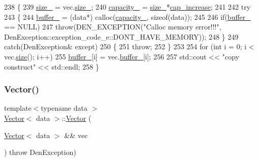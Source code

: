 \begin{DoxyCode}
238     \{
239         \hyperlink{classVector_a3c70fa478530a90177f2a7e7621ee688}{size\_} = vec.\hyperlink{classVector_a3c70fa478530a90177f2a7e7621ee688}{size\_};
240         \hyperlink{classVector_ad75911bb39018821f0e2911b6905b7ec}{capacity\_} = \hyperlink{classVector_a3c70fa478530a90177f2a7e7621ee688}{size\_}*\hyperlink{classVector_ae612684de42f3ecdefd867b54d232647}{cap\_increase};
241 
242         \textcolor{keywordflow}{try}
243             \{
244                 \hyperlink{classVector_a22db58ae9e92c6014e8ac657804a035a}{buffer\_} = (data*) calloc(\hyperlink{classVector_ad75911bb39018821f0e2911b6905b7ec}{capacity\_}, \textcolor{keyword}{sizeof}(data));
245 
246                 \textcolor{keywordflow}{if}(\hyperlink{classVector_a22db58ae9e92c6014e8ac657804a035a}{buffer\_} == NULL)
247                     \textcolor{keywordflow}{throw}(DEN\_EXCEPTION(\textcolor{stringliteral}{"Calloc memory error!!!"}, 
      DenException::exception\_code\_e::DONT\_HAVE\_MEMORY));
248             \}
249         \textcolor{keywordflow}{catch}(DenException& except)
250             \{
251                 \textcolor{keywordflow}{throw};
252             \}
253 
254         \textcolor{keywordflow}{for} (\textcolor{keywordtype}{int} i = 0; i < vec.\hyperlink{classVector_a81b1d973485244101caf8e901b4a03d9}{size}(); i++)
255             \hyperlink{classVector_a22db58ae9e92c6014e8ac657804a035a}{buffer\_}[i] = vec.\hyperlink{classVector_a22db58ae9e92c6014e8ac657804a035a}{buffer\_}[i];
256 
257         std::cout << \textcolor{stringliteral}{"copy construct"} << std::endl;
258     \}
\end{DoxyCode}
\mbox{\label{classVector_a729b947a5289bca0be614283775f0442}} 
\subsubsection{\texorpdfstring{Vector()}{Vector()}\hspace{0.1cm}{\footnotesize\ttfamily [5/5]}}
{\footnotesize\ttfamily template$<$typename data $>$ \\
\hyperlink{classVector}{Vector}$<$ data $>$\+::\hyperlink{classVector}{Vector} (\begin{DoxyParamCaption}\item[{\hyperlink{classVector}{Vector}$<$ data $>$ \&\&}]{vec }\end{DoxyParamCaption}) throw  Den\+Exception) }



